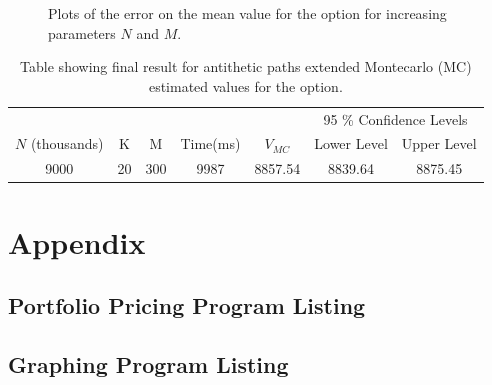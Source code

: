 \documentclass{article}
\begin{document}
\begin{figure}[!h]
\begin{subfigure}{0.6\textwidth}
      \label{fig:std_path}
  \end{subfigure}
\caption{Plots of the error on the mean value for the option for increasing parameters $N$ and $M$.}
\label{fig:std_vars}
\end{figure}
\begin{table}[!h]
\centering
\begin{tabular}{c|c c c c c c}
 & & & & & \multicolumn{2}{c}{95 \% Confidence Levels} \\
\cline{6-7}
\makecell{$N$\\(thousands)} & K & M & Time(ms) &$V_{MC}$ & Lower Level & Upper Level \\
\hline
9000   & 20  & 300 & 9987 & 8857.54 & 8839.64 & 8875.45      \\
\hline
\end{tabular}
\caption{Table showing final result for antithetic paths extended Montecarlo (MC) estimated values for the option.}
\label{table:final}
\end{table}

\clearpage
\section*{Appendix}
\lstset{style=mystyle}
\subsection*{Portfolio Pricing Program Listing}

\subsection*{Graphing Program Listing}

\end{document}
